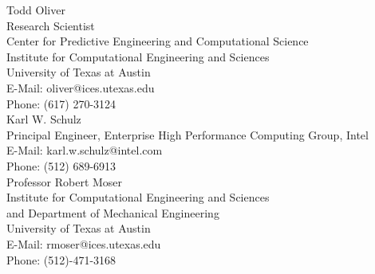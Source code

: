 


\noindent Todd Oliver \\
Research Scientist \\
Center for Predictive Engineering and Computational Science \\
Institute for Computational Engineering and Sciences \\
University of Texas at Austin \\
E-Mail: oliver@ices.utexas.edu \\
Phone: (617) 270-3124 \\
\newline
\newline
Karl W. Schulz \\
Principal Engineer, Enterprise High Performance Computing Group, Intel \\
E-Mail: karl.w.schulz@intel.com \\
Phone: (512) 689-6913 \\
\newline
\newline
\noindent Professor Robert Moser \\
Institute for Computational Engineering and Sciences \\
and Department of Mechanical Engineering \\
University of Texas at Austin \\
E-Mail: rmoser@ices.utexas.edu \\
\noindent Phone: (512)-471-3168 
\newline
\newline

